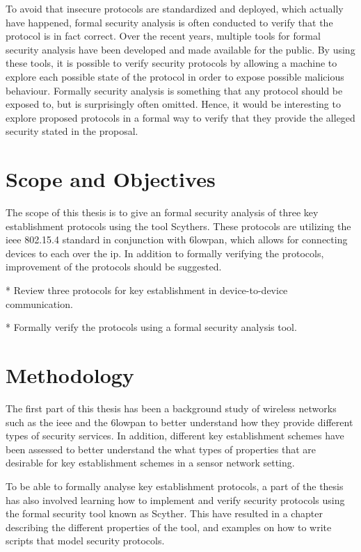 To avoid that insecure protocols are standardized and deployed, which actually have happened, formal security analysis is often conducted to verify that the protocol is in fact correct. Over the recent years, multiple tools for formal security analysis have been developed and made available for the public. By using these tools, it is possible to verify security protocols by allowing a machine to explore each possible state of the protocol in order to expose possible malicious behaviour. Formally security analysis is something that any protocol should be exposed to, but is surprisingly often omitted. Hence, it would be interesting to explore proposed protocols in a formal way to verify that they provide the alleged security stated in the proposal.

\section{Scope and Objectives}

The scope of this thesis is to give an formal security analysis of three key establishment protocols using the tool Scythers. These protocols are utilizing the \gls{ieee} 802.15.4 standard in conjunction with \gls{6lowpan}, which allows for connecting devices to each over the \gls{ip}. In addition to formally verifying the protocols, improvement of the protocols should be suggested. 

* Review three protocols for key establishment in device-to-device communication.

* Formally verify the protocols using a formal security analysis tool.

\section{Methodology}

The first part of this thesis has been a background study of wireless networks such as the \gls{ieee} and the \gls{6lowpan} to better understand how they provide different types of security services. In addition, different key establishment schemes have been assessed to better understand the what types of properties that are desirable for key establishment schemes in a sensor network setting.

To be able to formally analyse key establishment protocols, a part of the thesis has also involved learning how to implement and verify security protocols using the formal security tool known as Scyther. This have resulted in a chapter describing the different properties of the tool, and examples on how to write scripts that model security protocols.

